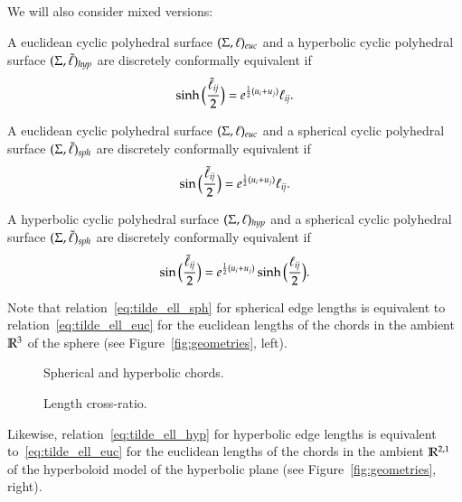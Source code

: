 \documentclass[Thesis]{subfiles}
\begin{document}
\begin{definition}
We will also consider mixed versions: 
\begin{compactitem}[$\bullet$]
\item A euclidean cyclic polyhedral surface $(\Sigma,\ell)_{\euc}$ and a
  hyperbolic cyclic polyhedral surface $(\Sigma,\tilde{\ell})_{\mathit{hyp}}$ are
  discretely conformally equivalent if
  \begin{equation}
    \label{eq:tilde_ell_hyp_euc}
    \sinh\Big(\frac{\tilde{\ell}_\mathit{ij}}{2}\Big)
    = e^{\frac{1}{2}(u_{i}+u_{j})}\ell_\mathit{ij}.
  \end{equation}
\item A euclidean cyclic polyhedral surface $(\Sigma,\ell)_{\euc}$ and a spherical cyclic
  polyhedral surface $(\Sigma,\tilde{\ell})_{\mathit{sph}}$ are discretely conformally
  equivalent if
  \begin{equation}\label{eq:tilde_ell_sph_euc}
    \sin\Big(\frac{\tilde{\ell}_\mathit{ij}}{2}\Big)
    = e^{\frac{1}{2}(u_{i}+u_{j})}\ell_\mathit{ij}.
  \end{equation}
\item A hyperbolic cyclic polyhedral surface $(\Sigma,\ell)_{\mathit{hyp}}$ and a spherical cyclic
  polyhedral surface $(\Sigma,\tilde{\ell})_{\mathit{sph}}$ are discretely conformally
  equivalent if
  \begin{equation}\label{eq:tilde_ell_sph_hyp}
    \sin\Big(\frac{\tilde{\ell}_\mathit{ij}}{2}\Big)
    = e^{\frac{1}{2}(u_{i}+u_{j})}\sinh\Big(\frac{\ell_\mathit{ij}}{2}\Big).
  \end{equation}
\end{compactitem}
\end{definition}

\begin{remark}
  \label{rem:chords}
  Note that relation~\eqref{eq:tilde_ell_sph} for spherical edge
  lengths is equivalent to relation~\eqref{eq:tilde_ell_euc} for the
  euclidean lengths of the chords in the ambient $\mathbb R^{3}$ of the
  sphere (see Figure~\ref{fig:geometries}, left).
  \begin{figure}
    \begin{minipage}[b]{0.6\linewidth}
      \centering \resizebox{\textwidth}{!}{
        
         }
      \caption{Spherical and hyperbolic chords.}
      \label{fig:geometries}
    \end{minipage}
    \hfill
    \begin{minipage}[b]{0.33\linewidth}
      \centering
      
      \caption{Length cross-ratio.}
      \label{fig:lcr}
    \end{minipage}
  \end{figure}
  Likewise, relation~\eqref{eq:tilde_ell_hyp} for hyperbolic edge
  lengths is equivalent to~\eqref{eq:tilde_ell_euc} for the euclidean
  lengths of the chords in the ambient $\mathbb R^{2,1}$ of the hyperboloid
  model of the hyperbolic plane (see Figure~\ref{fig:geometries},
  right).
\end{remark}
\end{document}
